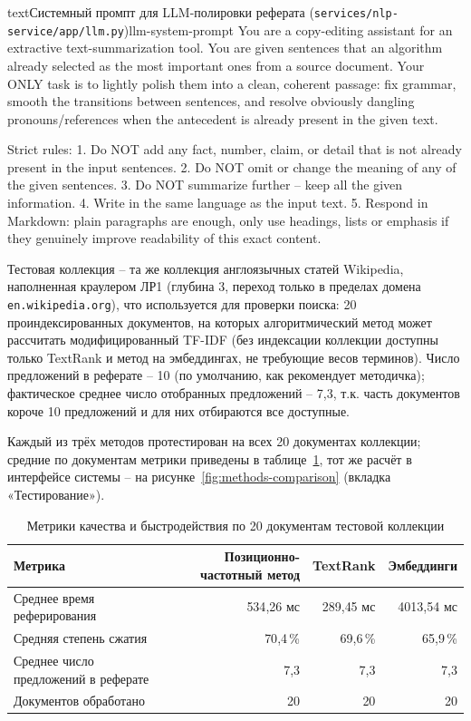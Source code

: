 \begin{codelisting}{text}{Системный промпт для LLM-полировки реферата (\texttt{services/nlp-service/app/llm.py})}{llm-system-prompt}
You are a copy-editing assistant for an extractive text-summarization tool. You are given sentences that an algorithm already selected as the most important ones from a source document. Your ONLY task is to lightly polish them into a clean, coherent passage: fix grammar, smooth the transitions between sentences, and resolve obviously dangling pronouns/references when the antecedent is already present in the given text.

Strict rules:
1. Do NOT add any fact, number, claim, or detail that is not already present in the input sentences.
2. Do NOT omit or change the meaning of any of the given sentences.
3. Do NOT summarize further -- keep all the given information.
4. Write in the same language as the input text.
5. Respond in Markdown: plain paragraphs are enough, only use headings, lists or emphasis if they genuinely improve readability of this exact content.
\end{codelisting}


Тестовая коллекция -- та же коллекция англоязычных статей Wikipedia,
наполненная краулером ЛР1 (глубина 3, переход только в пределах
домена \texttt{en.wikipedia.org}), что используется для проверки
поиска: 20 проиндексированных документов, на которых алгоритмический
метод может рассчитать модифицированный TF-IDF (без индексации
коллекции доступны только TextRank и метод на эмбеддингах, не
требующие весов терминов). Число предложений в реферате -- 10 (по
умолчанию, как рекомендует методичка); фактическое среднее число
отобранных предложений -- 7{,}3, т.к. часть документов короче 10
предложений и для них отбираются все доступные.


Каждый из трёх методов протестирован на всех 20 документах коллекции;
средние по документам метрики приведены в таблице~\ref{tab:metrics-summarization},
тот же расчёт в интерфейсе системы -- на рисунке~\ref{fig:methods-comparison}
(вкладка «Тестирование»).

\begin{table}[H]
  \centering
  \caption{Метрики качества и быстродействия по 20 документам тестовой коллекции}
  \label{tab:metrics-summarization}
  \begin{tabularx}{\textwidth}{|X|r|r|r|}
    \hline
    Метрика & Позиционно-частотный метод & TextRank & Эмбеддинги \\
    \hline
    Среднее время реферирования & 534{,}26 мс & 289{,}45 мс & 4013{,}54 мс \\
    \hline
    Средняя степень сжатия & 70{,}4\,\% & 69{,}6\,\% & 65{,}9\,\% \\
    \hline
    Среднее число предложений в реферате & 7{,}3 & 7{,}3 & 7{,}3 \\
    \hline
    Документов обработано & 20 & 20 & 20 \\
    \hline
  \end{tabularx}
\end{table}

